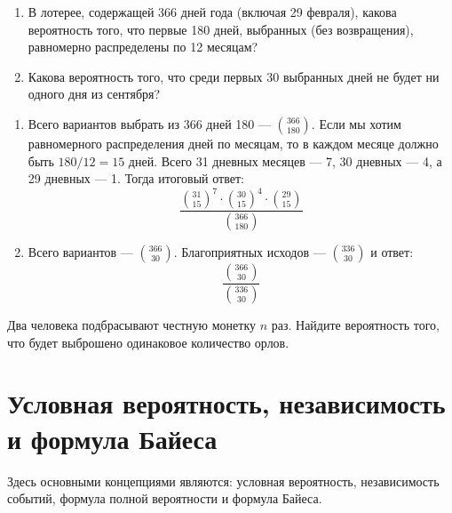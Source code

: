 \documentclass[document]{subfiles}
\begin{document}
\begin{problem}
    \begin{enumerate}
        \item В лотерее, содержащей 366 дней года (включая 29 февраля), какова вероятность того, что первые 180 дней, выбранных (без возвращения), равномерно распределены по 12 месяцам?
        \item Какова вероятность того, что среди первых 30 выбранных дней не будет ни одного дня из сентября?
    \end{enumerate}
\end{problem}
\begin{solution}
    \begin{enumerate}
        \item Всего вариантов выбрать из 366 дней 180 --- $\binom{366}{180}$. Если мы хотим равномерного распределения дней по месяцам, то в каждом месяце должно быть $180/12 = 15$ дней. Всего 31 дневных месяцев --- 7, 30 дневных --- 4, а 29 дневных --- 1. Тогда итоговый ответ:
            \[\frac{\binom{31}{15}^7 \cdot \binom{30}{15}^4 \cdot \binom{29}{15}}{\binom{366}{180}}\]
        \item Всего вариантов --- $\binom{366}{30}$. Благоприятных исходов --- $\binom{336}{30}$ и ответ:
            \[\frac{\binom{366}{30}}{\binom{336}{30}}\]
    \end{enumerate}
\end{solution}

\begin{problem}
    Два человека подбрасывают честную монетку $n$ раз. Найдите вероятность того, что будет выброшено одинаковое количество орлов.
\end{problem}

\section{Условная вероятность, независимость и формула Байеса}

Здесь основными концепциями являются: условная вероятность, независимость событий, формула полной вероятности и формула Байеса.
\end{document}
